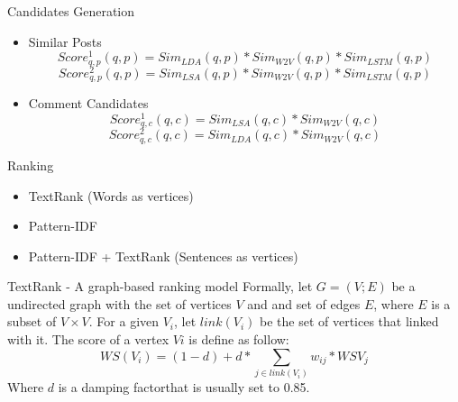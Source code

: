 \documentclass[aspectratio=169]{beamer}
\begin{document}
    \begin{frame}{Candidates Generation}
      \begin{itemize}
      \item Similar Posts
      \begin{equation}
         Score_{q,p}^1(q, p) = Sim_{LDA}(q, p) * Sim_{W2V}(q, p) * Sim_{LSTM}(q, p)
      \end{equation}
      \begin{equation}
         Score_{q,p}^2(q, p) = Sim_{LSA}(q, p) * Sim_{W2V}(q, p) * Sim_{LSTM}(q, p)
      \end{equation}
      \item Comment Candidates
      \begin{equation}
         Score_{q,c}^1(q, c) = Sim_{LSA}(q, c) * Sim_{W2V}(q, c)
      \end{equation}
      \begin{equation}
         Score_{q,c}^2(q, c) = Sim_{LDA}(q, c) * Sim_{W2V}(q, c)
      \end{equation}
    \end{itemize}
    \end{frame}

    \begin{frame}{Ranking}
      \begin{itemize}
        \item TextRank (Words as vertices)
        \item Pattern-IDF
        \item Pattern-IDF + TextRank (Sentences as vertices)
      \end{itemize}
    \end{frame}

    \begin{frame}{TextRank - A graph-based ranking model}
      Formally, let $G = (V; E)$ be a undirected graph with the set of vertices 
      $V$ and and set of edges $E$, where $E$ is a subset of $V \times V$. For 
      a given $V_i$, let $link(V_i)$ be the set of vertices that linked with 
      it. The score of a vertex $Vi$ is define as follow:
      \begin{equation}
        WS(V_i) = (1 - d) + d * \sum_{j \in link(V_i)}{w_{ij} * WS{V_j}}
      \end{equation}
      Where $d$ is a damping factor\footnotemark that is usually set to 0.85.

    \end{frame}
\end{document}
